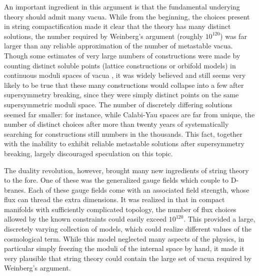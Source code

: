 \documentclass[aps,amsfonts]{ar2e}
\begin{document}
An important ingredient in this argument is that the fundamental
underying theory should admit many vacua.  While from the beginning,
the choices present in string compactification made it clear that the
theory has many distinct solutions, the number required by Weinberg's
argument (roughly $10^{120}$) was far larger than any reliable
approximation of the number of metastable vacua. Though some estimates
of very large numbers of constructions were made by counting distinct
soluble points (lattice constructions or orbifold models) in
continuous moduli spaces of vacua
\cite{Lerche:1986cx},
it was widely believed and still
seems very likely to be true that these many constructions would
collapse into a few after supersymmetry breaking, since they were
simply distinct points on the same supersymmetric moduli space.  The
number of discretely differing solutions seemed far smaller: for
instance, while Calabi-Yau spaces are far from unique, the number of
distinct choices after more than twenty years of systematically
searching for constructions still numbers in the thousands.  This
fact, together with the inability to exhibit reliable metastable
solutions after supersymmetry breaking, largely discouraged
speculation on this topic.

The duality revolution, however, brought many new ingredients of string theory
to the fore.  One of these was the generalized gauge fields which couple to
D-branes.  Each of these gauge fields come with an associated field strength,
whose flux can thread the extra dimensions.  It was realized in
\cite{Bousso:2000xa}
that in compact manifolds with sufficiently complicated topology, the
number of flux choices allowed by the known constraints could easily
exceed $10^{120}$.  This provided a large, discretely varying
collection of models, which could realize different values of the
cosmological term.
While this model neglected many aspects of the physics, in particular
simply freezing the moduli of the internal space by hand,
it made it very plausible
that string theory could contain the large set of
vacua required by Weinberg's argument.
\end{document}
